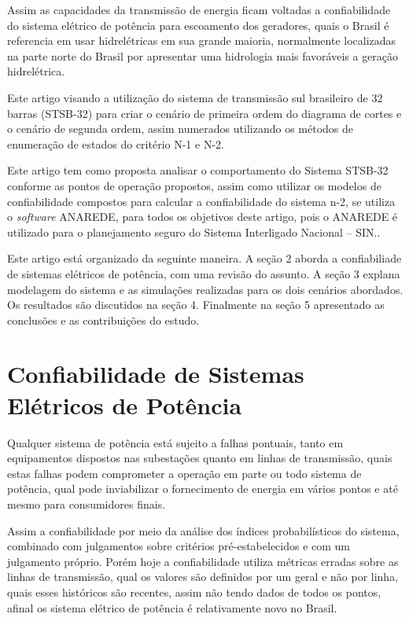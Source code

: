 \documentclass[lettersize,journal]{IEEEtran}
\begin{document}
Assim as capacidades da transmissão de energia ficam voltadas a confiabilidade do sistema elétrico de potência para escoamento dos geradores, quais o Brasil é referencia em usar hidrelétricas em sua grande maioria, normalmente localizadas na parte norte do Brasil por apresentar uma hidrologia mais favoráveis a geração hidrelétrica.

Este artigo visando a utilização do sistema de transmissão sul brasileiro de 32 barras (STSB-32) para criar o cenário de primeira ordem do diagrama de cortes e o cenário de segunda ordem, assim numerados utilizando os métodos de enumeração de estados do critério N-1 e N-2\cite{Lazari}.

Este artigo tem como proposta analisar o comportamento do Sistema STSB-32 conforme as pontos de operação propostos, assim como utilizar os modelos de confiabilidade compostos para calcular a confiabilidade do sistema n-2, se utiliza o \textit{software} ANAREDE, para todos os objetivos deste artigo, pois o ANAREDE é utilizado para o planejamento seguro do Sistema Interligado Nacional – SIN..

Este artigo está organizado da seguinte maneira. A seção 2 aborda a confiabiliade de sistemas elétricos de potência, com uma revisão do assunto. A seção 3 explana modelagem do sistema e as simulações realizadas para os dois cenários abordados. Os resultados são discutidos na seção 4. Finalmente na seção 5 apresentado as conclusões e as contribuições do estudo.

\section{Confiabilidade de Sistemas \\ Elétricos de Potência}

Qualquer sistema de potência está sujeito a falhas pontuais, tanto em equipamentos dispostos nas subestações quanto em linhas de transmissão, quais estas falhas podem comprometer a operação em parte ou todo sistema de potência, qual pode inviabilizar o fornecimento de energia em vários pontos e até mesmo para consumidores finais.

Assim a confiabilidade por meio da análise dos índices probabilísticos do sistema, combinado com julgamentos sobre critérios pré-estabelecidos e com um julgamento próprio. Porém hoje a confiabilidade utiliza métricas erradas sobre as linhas de transmissão, qual os valores são definidos por um geral e não por linha, quais esses históricos são recentes, assim não tendo dados de todos os pontos, afinal os sistema elétrico de potência é relativamente novo no Brasil.
\end{document}
